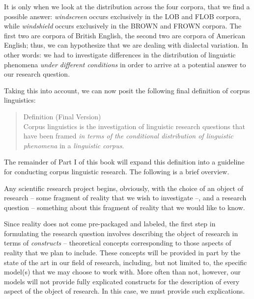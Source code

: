 It is only when we look at the distribution across the four corpora, that we find a possible answer: \textit{windscreen} occurs exclusively in the LOB and FLOB corpora, while \textit{windshield} occurs exclusively in the BROWN and FROWN corpora. The first two are corpora of British English, the second two are corpora of American English; thus, we can hypothesize that we are dealing with dialectal variation. In other words: we had to investigate differences in the distribution of linguistic phenomena \emph{under different conditions} in order to arrive at a potential answer to our research question.

Taking this into account, we can now posit the following final definition of corpus linguistics:

\begin{quotation}
Definition (Final Version) \\
Corpus linguistics is the investigation of linguistic research questions that have been framed \emph{in terms of the conditional distribution of linguistic phenomena} in a \emph{linguistic corpus}.
\end{quotation}

The remainder of Part I of this book will expand this definition into a guideline for conducting corpus linguistic research. The following is a brief overview.

Any scientific research project begins, obviously, with the choice of an object of research -- some fragment of reality that we wish to investigate --, and a research question -- something about this fragment of reality that we would like to know.

Since reality does not come pre-packaged and labeled, the first step in formulating the research question involves describing the object of research in terms of \emph{constructs} -- theoretical concepts corresponding to those aspects of reality that we plan to include. These concepts will be provided in part by the state of the art in our field of research, including, but not limited to, the specific model(s) that we may choose to work with. More often than not, however, our models will not provide fully explicated constructs for the description of every aspect of the object of research. In this case, we must provide such explications.

